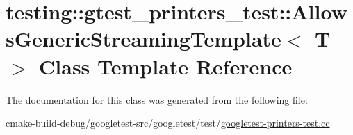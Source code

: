 \hypertarget{classtesting_1_1gtest__printers__test_1_1AllowsGenericStreamingTemplate}{}\section{testing\+::gtest\+\_\+printers\+\_\+test\+::Allows\+Generic\+Streaming\+Template$<$ T $>$ Class Template Reference}
\label{classtesting_1_1gtest__printers__test_1_1AllowsGenericStreamingTemplate}


The documentation for this class was generated from the following file\+:\begin{DoxyCompactItemize}
\item 
cmake-\/build-\/debug/googletest-\/src/googletest/test/\mbox{\hyperlink{googletest-printers-test_8cc}{googletest-\/printers-\/test.\+cc}}\end{DoxyCompactItemize}
